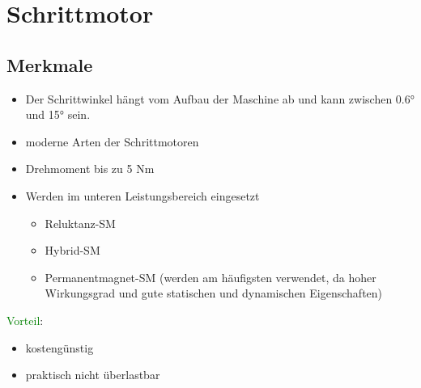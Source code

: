 \section{Schrittmotor}
\subsection{Merkmale}
    \begin{itemize}
        \item Der Schrittwinkel hängt vom Aufbau der Maschine ab und kann zwischen 0.6° und 15° sein.
        \item moderne Arten der Schrittmotoren
        \item Drehmoment bis zu 5 Nm
        \item Werden im unteren Leistungsbereich eingesetzt
        \begin{itemize}
            \item Reluktanz-SM
            \item Hybrid-SM
            \item Permanentmagnet-SM (werden am häufigsten verwendet, da hoher Wirkungsgrad und gute statischen und dynamischen Eigenschaften)
        \end{itemize}
    \end{itemize}
    \textcolor{green}{Vorteil}:
    \begin{itemize}
        \item kostengünstig
        \item praktisch nicht überlastbar
    \end{itemize}

